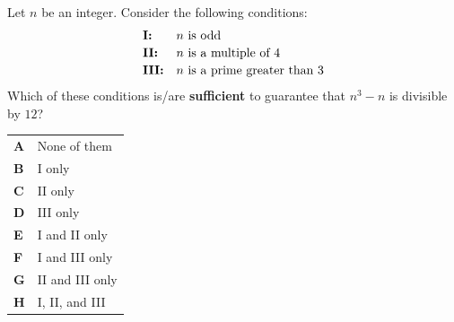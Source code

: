 \documentclass[11pt,a4paper]{article}
\begin{document}
\begin{enumerate}[label=\textbf{\arabic*.},leftmargin=*,itemsep=0pt,start=2]
\questionitem[Number]
Let $n$ be an integer. Consider the following conditions:
\[
\begin{array}{@{}l l@{}}
\textbf{I:} & \text{$n$ is odd} \\[2pt]
\textbf{II:} & \text{$n$ is a multiple of $4$} \\[2pt]
\textbf{III:} & \text{$n$ is a prime greater than $3$}
\end{array}
\]
Which of these conditions is/are \textbf{sufficient} to guarantee that $n^3-n$ is divisible by $12$?

\par\vspace*{12pt}
\begin{tabularx}{\linewidth}{@{}>{\bfseries}l Y@{}}
A &
None of them
\\[0.8em]
B &
I only
\\[0.8em]
C &
II only
\\[0.8em]
D &
III only
\\[0.8em]
E &
I and II only
\\[0.8em]
F &
I and III only
\\[0.8em]
G &
II and III only
\\[0.8em]
H &
I, II, and III
\\
\end{tabularx}
\end{enumerate}
\clearpage
\thispagestyle{djspaper}
\vspace*{8pt}
\end{document}
